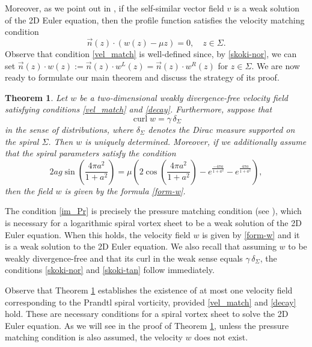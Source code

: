 \documentclass[11pt, letterpaper, reqno]{amsart}
\numberwithin{equation}{section}
\theoremstyle{definition}
\theoremstyle{plain}
\newtheorem{theorem}{Theorem}[section]
\numberwithin{equation}{section}
\DeclareMathOperator{\curl}{curl}
\begin{document}
Moreover, as we point out in \cite[Theorem 1.2]{CKO}, if the self-similar vector field $v$ is a weak solution of the 2D Euler equation, then the profile function satisfies the velocity matching condition
\begin{equation}\label{vel_match}
\vec{n}(z)\cdot\left(w(z)-\mu z\right)=0, \quad z\in \Sigma.
\end{equation}
Observe that condition \eqref{vel_match} is well-defined since, by \eqref{skoki-nor}, we can set $\vec{n}(z)\cdot w(z) := \vec{n}(z)\cdot w^{L}(z) = \vec{n}(z)\cdot w^{R}(z)$ for $z\in\Sigma$. We are now ready to formulate our main theorem and discuss the strategy of its proof. 
\begin{theorem}\label{glowne}
Let $w$ be a two-dimensional weakly divergence-free velocity field satisfying conditions \eqref{vel_match} and \eqref{decay}. Furthermore, suppose that
\begin{equation}\label{dist-eq}
\curl w = \gamma\, \delta_{\Sigma}
\end{equation}
in the sense of distributions, where $\delta_{\Sigma}$ denotes the Dirac measure supported on the spiral $\Sigma$. Then $w$ is uniquely determined. Moreover, if we additionally assume that the spiral parameters satisfy the condition
\begin{equation}\label{im_Pr}
2ag \sin\left(\frac{4\pi a^2}{1+a^2}\right) = \mu \left(2\cos\left(\frac{4\pi a^2}{1+a^2}\right) - e^{\frac{-4\pi a}{1+a^2}} - e^{\frac{4\pi a}{1+a^2}}\right),
\end{equation}
then the field $w$ is given by the formula \eqref{form-w}.
\end{theorem}
The condition \eqref{im_Pr} is precisely the pressure matching condition (see \cite{CKO}), which is necessary for a logarithmic spiral vortex sheet to be a weak solution of the 2D Euler equation. When this holds, the velocity field $w$ is given by \eqref{form-w} and it is a weak solution to the 2D Euler equation.
We also recall that assuming $w$ to be weakly divergence-free and that its curl in the weak sense equals $\gamma\,\delta_{\Sigma}$, the conditions \eqref{skoki-nor} and \eqref{skoki-tan} follow immediately. 

Observe that Theorem \ref{glowne} establishes the existence of at most one velocity field corresponding to the Prandtl spiral vorticity, provided \eqref{vel_match} and \eqref{decay} hold. These are necessary conditions for a spiral vortex sheet to solve the 2D Euler equation.
As we will see in the proof of Theorem \ref{glowne}, unless the pressure matching condition is also assumed, the velocity $w$ does not exist.
\end{document}
